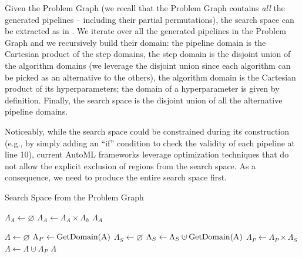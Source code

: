 Given the Problem Graph (we recall that the Problem Graph contains \emph{all} the generated pipelines -- including their partial permutations), the search space can be extracted as in . 
We iterate over all the generated pipelines in the Problem Graph and we recursively build their domain: the pipeline domain is the Cartesian product of the step domains, the step domain is the disjoint union of the algorithm domains (we leverage the disjoint union since each algorithm can be picked as an alternative to the others), the algorithm domain is the Cartesian product of its hyperparameters; the domain of a hyperparameter is given by definition.
Finally, the search space is the disjoint union of all the alternative pipeline domains.

Noticeably, while the search space could be constrained during its construction (e.g., by simply adding an ``if'' condition to check the validity of each pipeline at  line 10), current AutoML frameworks leverage optimization techniques that do not allow the explicit exclusion of regions from the search space.
As a consequence, we need to produce the entire search space first.

\begin{algorithm}[t]
\caption{Search Space from the Problem Graph}
\label{spacealgorithm}
\footnotesize
\begin{algorithmic}[1]
    \item[]
        \State $\Lambda_A \leftarrow \varnothing$
         
            \State $\Lambda_A \leftarrow \Lambda_A \times \Lambda_h$ 
        \EndFor
        \State \Return $\Lambda_A$ 
    \EndProcedure
    \item[]
    \State $\Lambda \leftarrow \varnothing$ 
     
        \State $ \Lambda_{P} \leftarrow \textup{GetDomain(A)}$ 
          
            \State $\Lambda_{S}  \leftarrow \varnothing$ 
              
                \State $\Lambda_{S} \leftarrow \Lambda_{S} \cupdot \textup{GetDomain(A)}$ 
            \EndFor
            \State $\Lambda_P \leftarrow \Lambda_P \times \Lambda_S$ 
        \EndFor
        \State $\Lambda \leftarrow \Lambda \cupdot \Lambda_P$ 
    \EndFor
    \State \Return $\Lambda$ 
\end{algorithmic}
\end{algorithm}

